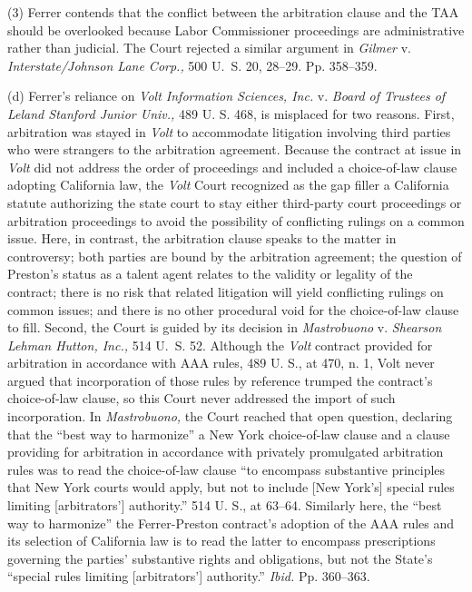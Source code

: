   (3) Ferrer contends that the conflict between the arbitration
clause and the TAA should be overlooked because Labor Commissioner
pro\newpage ceedings are administrative rather than judicial. The Court
rejected a similar argument in \emph{Gilmer} v. \emph{Interstate/Johnson Lane
Corp.,} 500 U.~S. 20, 28--29. Pp. 358--359.

  (d) Ferrer's reliance on \emph{Volt Information Sciences, Inc.} v.
\emph{Board of Trustees of Leland Stanford Junior Univ.,} 489 U. S. 468,
is misplaced for two reasons. First, arbitration was stayed in \emph{Volt}
to accommodate litigation involving third parties who were strangers to
the arbitration agreement. Because the contract at issue in \emph{Volt}
did not address the order of proceedings and included a choice-of-law
clause adopting California law, the \emph{Volt} Court recognized as the
gap filler a California statute authorizing the state court to stay
either third-party court proceedings or arbitration proceedings to avoid
the possibility of conflicting rulings on a common issue. Here, in
contrast, the arbitration clause speaks to the matter in controversy;
both parties are bound by the arbitration agreement; the question of
Preston's status as a talent agent relates to the validity or legality
of the contract; there is no risk that related litigation will yield
conflicting rulings on common issues; and there is no other procedural
void for the choice-of-law clause to fill. Second, the Court is guided
by its decision in \emph{Mastrobuono} v. \emph{Shearson} \emph{Lehman Hutton,
Inc.,} 514 U.~S. 52. Although the \emph{Volt} contract provided for
arbitration in accordance with AAA rules, 489 U. S., at 470, n. 1,
Volt never argued that incorporation of those rules by reference trumped
the contract's choice-of-law clause, so this Court never addressed
the import of such incorporation. In \emph{Mastrobuono,} the Court reached
that open question, declaring that the ``best way to harmonize'' a
New York choice-of-law clause and a clause providing for arbitration
in accordance with privately promulgated arbitration rules was to read
the choice-of-law clause ``to encompass substantive principles that
New York courts would apply, but not to include [New York's] special
rules limiting [arbitrators'] authority.'' 514 U. S., at 63--64.
Similarly here, the ``best way to harmonize'' the Ferrer-Preston
contract's adoption of the AAA rules and its selection of California
law is to read the latter to encompass prescriptions governing the
parties' substantive rights and obligations, but not the State's
``special rules limiting [arbitrators'] authority.'' \emph{Ibid.}
Pp. 360--363.


